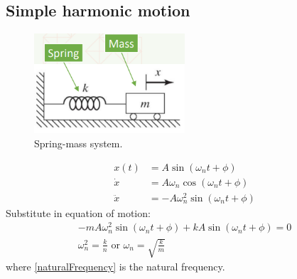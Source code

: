 \documentclass[class=report, crop=false, 12pt,a4paper]{standalone}
\begin{document}
\subsection{Simple harmonic motion}
\begin{figure}[H]
    \centering
    \includegraphics[width = 0.5\textwidth]{../img/diagram1.jpg}
    \caption{Spring-mass system.}
\end{figure}
\begin{align}
    x(t) &= A \sin\left(\omega_n t + \phi\right)\\
    \dot{x} &= A \omega_n \cos \left(\omega_n t + \phi\right)\\
    \ddot{x} &= - A \omega_n^2 \sin \left(\omega_n t + \phi\right)
\end{align}
Substitute in equation of motion:
\begin{gather}
    -m A \omega_n^2 \sin\left(\omega_n t + \phi\right) + k A \sin \left(\omega_n t + \phi \right) = 0\\
    \omega_n^2 = \frac{k}{n} \textrm{ or } \omega_n = \sqrt{\frac{k}{m}} \label{naturalFrequency}
\end{gather}
where \ref{naturalFrequency} is the natural frequency.
\end{document}
